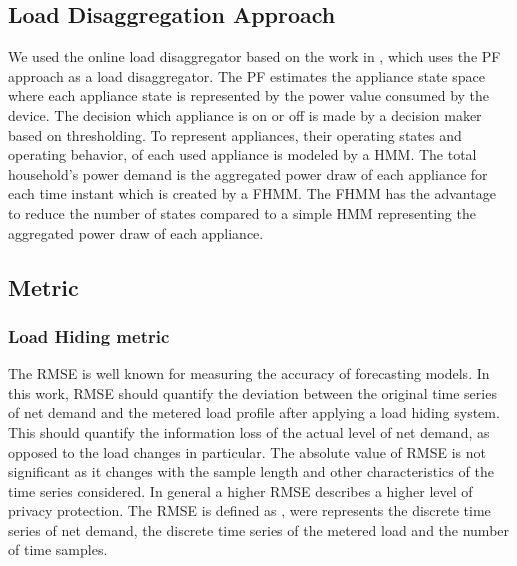 \documentclass{article}
\begin{document}
\subsection{Load Disaggregation Approach}
We used the online load disaggregator based on the work in \cite{Egarter2013BuildSys}, which uses the \ac{PF} approach as a load disaggregator.
The \ac{PF} estimates the appliance state space where each appliance state is represented by the power value consumed by the device.
The decision which appliance is on or off is made by a decision maker based on thresholding.
To represent appliances, their operating states and operating behavior, of each used appliance is modeled by a \ac{HMM}.
The total household's power demand is the aggregated power draw of each appliance for each time instant which is created by a \ac{FHMM}.
The \ac{FHMM} has the advantage to reduce the number of states compared to a simple \ac{HMM} representing the aggregated power draw of each appliance.

\subsection{Metric}

\subsubsection{Load Hiding metric} 
The \ac{RMSE} is well known for measuring the accuracy of forecasting models. In this work, \ac{RMSE} should quantify the deviation between the original time series of net demand and the metered load profile after applying a load hiding system. This should quantify the information loss of the actual level of net demand, as opposed to the load changes in particular. The absolute value of \ac{RMSE} is not significant as it changes with the sample length and other characteristics of the time series considered. In general a higher \ac{RMSE} describes a higher level of privacy protection. The \ac{RMSE} is defined as
,
were  represents the discrete time series of net demand,  the discrete time series of the metered load and  the number of time samples.
\end{document}

